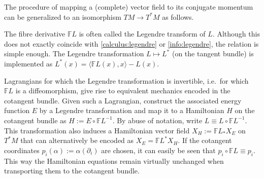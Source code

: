     The procedure of mapping a (complete) vector field to its conjugate momentum can be generalized to an isomorphism $TM\rightarrow T^*M$ as follows.
    \begin{remark}
        The fibre derivative $\mathbb{F}L$ is often called the Legendre transform of $L$. Although this does not exactly coincide with \cref{calculus:legendre} or \cref{info:legendre}, the relation is simple enough. The Legendre transformation $L\mapsto L^*$ (on the tangent bundle) is implemented as $L^*(x) = \langle\mathbb{F}L(x),x\rangle - L(x)$.
    \end{remark}

    Lagrangians for which the Legendre transformation is invertible, i.e.~for which $\mathbb{F}L$ is a diffeomorphism, give rise to equivalent mechanics encoded in the cotangent bundle. Given such a Lagrangian, construct the associated energy function $E$ by a Legendre transformation and map it to a Hamiltonian $H$ on the cotangent bundle as $H:=E\circ\mathbb{F}L^{-1}$. By abuse of notation, write $L\equiv L\circ\mathbb{F}L^{-1}$. This transformation also induces a Hamiltonian vector field $X_H:=\mathbb{F}L_*X_E$ on $T^*M$ that can alternatively be encoded as $X_E=\mathbb{F}L^*X_H$. If the cotangent coordinates $p_i(\alpha) := \alpha(\partial_i)$ are chosen, it can easily be seen that $p_i\circ\mathbb{F}L\equiv p_i$. This way the Hamiltonian equations remain virtually unchanged when transporting them to the cotangent bundle.

